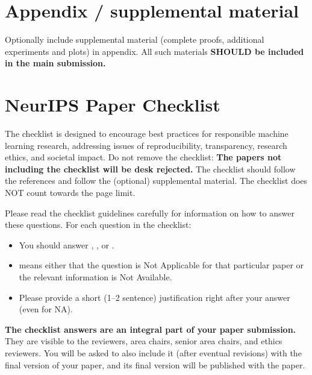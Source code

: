 \documentclass{article}
\begin{document}
\appendix

\section{Appendix / supplemental material}


Optionally include supplemental material (complete proofs, additional experiments and plots) in appendix.
All such materials \textbf{SHOULD be included in the main submission.}


\newpage
\section*{NeurIPS Paper Checklist}

The checklist is designed to encourage best practices for responsible machine learning research, addressing issues of reproducibility, transparency, research ethics, and societal impact. Do not remove the checklist: {\bf The papers not including the checklist will be desk rejected.} The checklist should follow the references and follow the (optional) supplemental material.  The checklist does NOT count towards the page
limit. 

Please read the checklist guidelines carefully for information on how to answer these questions. For each question in the checklist:
\begin{itemize}
    \item You should answer \answerYes{}, \answerNo{}, or \answerNA{}.
    \item \answerNA{} means either that the question is Not Applicable for that particular paper or the relevant information is Not Available.
    \item Please provide a short (1–2 sentence) justification right after your answer (even for NA). 
\end{itemize}

{\bf The checklist answers are an integral part of your paper submission.} They are visible to the reviewers, area chairs, senior area chairs, and ethics reviewers. You will be asked to also include it (after eventual revisions) with the final version of your paper, and its final version will be published with the paper.
\end{document}
